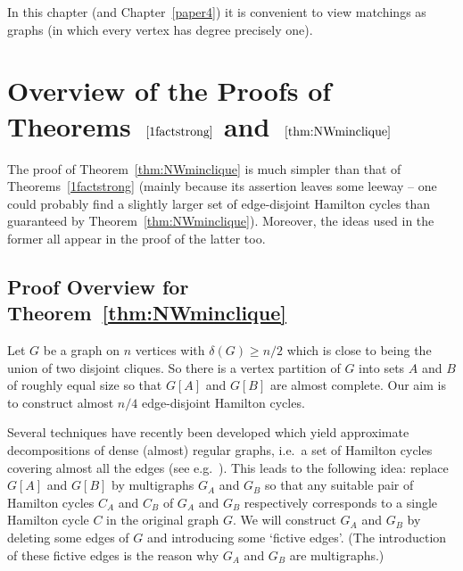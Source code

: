 \documentclass{memo-l}
\numberwithin{section}{chapter}
\numberwithin{equation}{section}
\numberwithin{firstthm}{section}
\numberwithin{figure}{section}
\begin{document}
In this chapter (and Chapter~\ref{paper4}) it is convenient to view matchings as graphs (in which every vertex has degree precisely one).


\section{Overview of the Proofs of Theorems~$\text{\ref{1factstrong}}$ and~$\text{\ref{thm:NWminclique}}$}\label{overview}

The proof of Theorem~\ref{thm:NWminclique} is much simpler than that of Theorems~\ref{1factstrong}
(mainly because its assertion leaves some leeway -- one could probably find a slightly larger set of edge-disjoint Hamilton cycles than guaranteed by Theorem~\ref{thm:NWminclique}).
Moreover, the ideas used in the former all appear in the proof of the latter too.


\subsection{Proof Overview for Theorem~\ref{thm:NWminclique}} \label{sec:overI}

Let $G$ be a graph on $n$ vertices with $\delta(G) \ge n/2$ which is close to being the union of two disjoint cliques.
So there is a vertex partition of $G$ into sets $A$ and $B$ of roughly equal size so that $G[A]$ and $G[B]$ are almost complete.
Our aim is to construct almost $n/4$ edge-disjoint Hamilton cycles.

Several techniques have recently been developed which yield
approximate decompositions of dense (almost) regular graphs, i.e.~a set of Hamilton cycles covering almost all the edges 
(see e.g.~\cite{CKO,FKS,fk,KOTkelly,OS}).
This leads to the following idea: replace $G[A]$ and $G[B]$ by multigraphs $G_A$ and $G_B$
so that any suitable pair of Hamilton cycles $C_A$ and $C_B$ of $G_A$ and $G_B$ respectively corresponds
to a single Hamilton cycle $C$ in the original graph $G$. 
We will construct $G_A$ and $G_B$ by deleting some edges of $G$ and introducing some `fictive edges'.
(The introduction of these fictive edges is the reason why $G_A$ and $G_B$ are multigraphs.)
\end{document}
